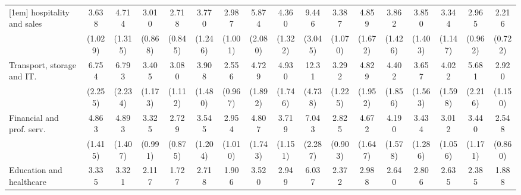 {\begin{tabular}{l*{16}{c}}
[1em]
hospitality and sales&       3.638\sym{***}&       4.714\sym{***}&       3.010\sym{***}&       2.718\sym{**} &       3.770\sym{***}&       2.987\sym{**} &       5.874\sym{***}&       4.360\sym{***}&       9.446\sym{***}&       3.387\sym{***}&       4.859\sym{***}&       3.862\sym{***}&       3.850\sym{***}&       3.344\sym{***}&       2.965\sym{***}&       2.216\sym{*}  \\
                    &     (1.029)         &     (1.315)         &     (0.868)         &     (0.845)         &     (1.246)         &     (1.001)         &     (2.080)         &     (1.322)         &     (3.045)         &     (1.070)         &     (1.672)         &     (1.426)         &     (1.403)         &     (1.147)         &     (0.962)         &     (0.722)         \\
[1em]
Transport, storage and IT.&       6.754\sym{***}&       6.793\sym{***}&       3.405\sym{***}&       3.080\sym{**} &       3.908\sym{***}&       2.556\sym{*}  &       4.729\sym{***}&       4.930\sym{***}&       12.31\sym{***}&       3.292\sym{**} &       4.829\sym{***}&       4.402\sym{***}&       3.657\sym{**} &       4.022\sym{***}&       5.681\sym{***}&       2.920\sym{**} \\
                    &     (2.255)         &     (2.234)         &     (1.173)         &     (1.112)         &     (1.480)         &     (0.967)         &     (1.892)         &     (1.746)         &     (4.738)         &     (1.225)         &     (1.952)         &     (1.856)         &     (1.563)         &     (1.598)         &     (2.216)         &     (1.150)         \\
[1em]
Financial and prof. serv.&       4.863\sym{***}&       4.893\sym{***}&       3.325\sym{***}&       2.729\sym{**} &       3.545\sym{***}&       2.954\sym{**} &       4.807\sym{***}&       3.719\sym{***}&       7.043\sym{***}&       2.825\sym{**} &       4.672\sym{***}&       4.190\sym{***}&       3.434\sym{***}&       3.012\sym{**} &       3.440\sym{***}&       2.548\sym{**} \\
                    &     (1.415)         &     (1.407)         &     (0.991)         &     (0.875)         &     (1.204)         &     (1.010)         &     (1.743)         &     (1.151)         &     (2.287)         &     (0.903)         &     (1.647)         &     (1.578)         &     (1.286)         &     (1.056)         &     (1.171)         &     (0.860)         \\
[1em]
Education and healthcare&       3.335\sym{***}&       3.321\sym{***}&       2.117\sym{*}  &       1.727         &       2.718\sym{**} &       1.906         &       3.520\sym{***}&       2.949\sym{***}&       6.037\sym{***}&       2.372\sym{**} &       2.988\sym{**} &       2.640\sym{**} &       2.806\sym{**} &       2.635\sym{**} &       2.385\sym{**} &       1.888         \\

\end{tabular}}
